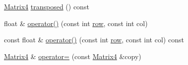 \begin{DoxyCompactItemize}
\item 
\hyperlink{classprism_1_1geometry_1_1_matrix4}{Matrix4} \hyperlink{classprism_1_1geometry_1_1_matrix4_a866ecddb26c6e64e12aa826595a47fb2}{transposed} () const 
\item 
float \& \hyperlink{classprism_1_1geometry_1_1_matrix4_a1307c1b49b75509880af85ddcc8585dd}{operator()} (const int \hyperlink{classprism_1_1geometry_1_1_matrix4_ad86ea7ce40789f10cafa0ec56403f0fd}{row}, const int col)
\item 
const float \& \hyperlink{classprism_1_1geometry_1_1_matrix4_a3930862eadea631f7b501155b6342531}{operator()} (const int \hyperlink{classprism_1_1geometry_1_1_matrix4_ad86ea7ce40789f10cafa0ec56403f0fd}{row}, const int col) const 
\item 
\hyperlink{classprism_1_1geometry_1_1_matrix4}{Matrix4} \& \hyperlink{classprism_1_1geometry_1_1_matrix4_a83d285e8458d7e9bfd4b952cf07388ab}{operator=} (const \hyperlink{classprism_1_1geometry_1_1_matrix4}{Matrix4} \&copy)
\end{DoxyCompactItemize}
